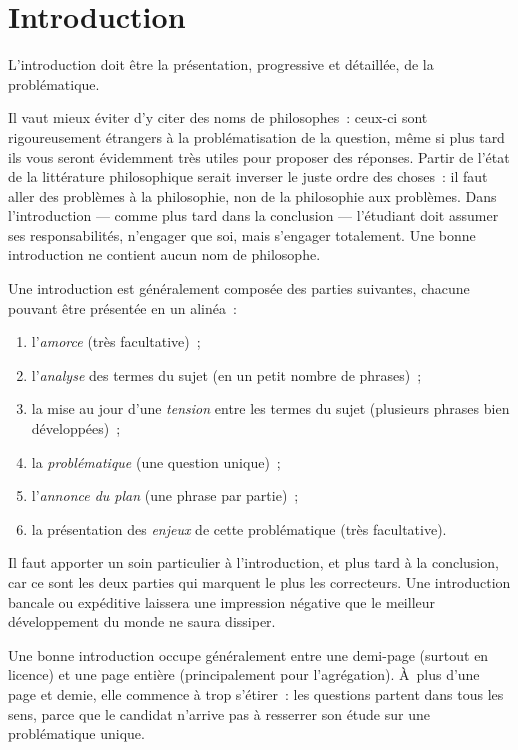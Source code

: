 \documentclass[a4paper]{article}
\begin{document}
\section{Introduction}
\label{sec-2}


L'introduction doit être la présentation, progressive et détaillée, de
la problématique.

Il vaut mieux éviter d'y citer des noms de philosophes : ceux-ci sont
rigoureusement étrangers à la problématisation de la question, même si
plus tard ils vous seront évidemment très utiles pour proposer des
réponses. Partir de l'état de la littérature philosophique serait
inverser le juste ordre des choses : il faut aller des problèmes à la
philosophie, non de la philosophie aux problèmes. Dans l'introduction
--- comme plus tard dans la conclusion --- l'étudiant doit assumer ses
responsabilités, n'engager que soi, mais s'engager totalement. Une bonne
introduction ne contient aucun nom de philosophe.

Une introduction est généralement composée des parties suivantes,
chacune pouvant être présentée en un alinéa :

\begin{enumerate}
\item l'\emph{amorce} (très facultative) ;
\item l'\emph{analyse} des termes du sujet (en un petit nombre de phrases) ;
\item la mise au jour d'une \emph{tension} entre les termes du sujet (plusieurs
   phrases bien développées) ;
\item la \emph{problématique} (une question unique) ;
\item l'\emph{annonce du plan} (une phrase par partie) ;
\item la présentation des \emph{enjeux} de cette problématique (très
   facultative).
\end{enumerate}

Il faut apporter un soin particulier à l'introduction, et plus tard à la
conclusion, car ce sont les deux parties qui marquent le plus les
correcteurs. Une introduction bancale ou expéditive laissera une
impression négative que le meilleur développement du monde ne saura
dissiper.

Une bonne introduction occupe généralement entre une demi-page (surtout
en licence) et une page entière (principalement pour l'agrégation).
À plus d'une page et demie, elle commence à trop s'étirer : les
questions partent dans tous les sens, parce que le candidat n'arrive pas
à resserrer son étude sur une problématique unique.
\end{document}
